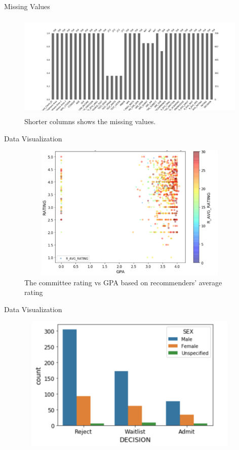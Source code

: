 \documentclass[11pt]{beamer}
\begin{document}
\begin{frame}{Missing Values}
	\begin{figure}
		\centering
		\includegraphics[width=11cm, height=5cm]{missing_data}
		\caption{Shorter columns shows the missing values.}
	\end{figure}		
\end{frame}
\begin{frame}{Data Visualization}
	\vspace{-2mm}
	\begin{figure}
		\centering
		\includegraphics[width=11cm, height=6.5cm]{figure1a}
		\caption{The committee rating vs GPA based on recommenders' average rating}
	\end{figure}		
\end{frame}




\begin{frame}{Data Visualization}
	\vspace{-2mm}
	\begin{figure}
		\centering
		\includegraphics[width=11cm, height=6.5cm]{figure1b}
	\end{figure}		
\end{frame}
\end{document}
